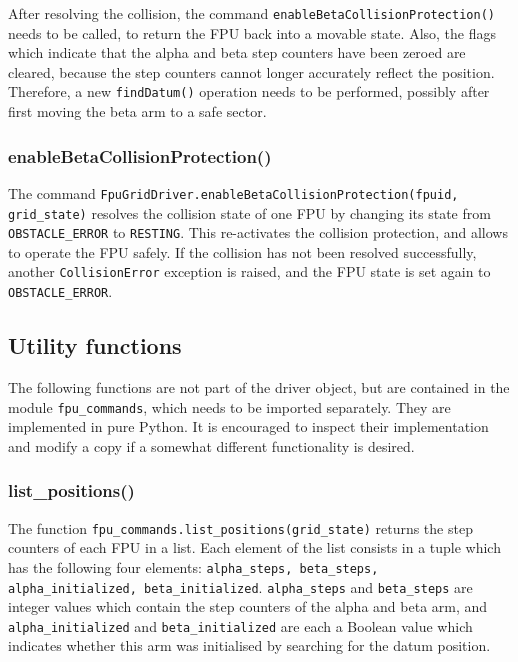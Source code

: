 \documentclass[11pt,a4paper]{report}
\begin{document}
After resolving the collision, the command
\texttt{enableBetaCollisionProtection()} needs to be called, to return
the FPU back into a movable state.  Also, the flags which indicate
that the alpha and beta step counters have been zeroed are cleared,
because the step counters cannot longer accurately reflect the
position. Therefore, a new \texttt{findDatum()} operation needs to be
performed, possibly after first moving the beta arm to a safe sector.



\subsubsection{enableBetaCollisionProtection()}

The command \texttt{FpuGridDriver.enableBetaCollisionProtection(fpuid,
  grid\_state)} resolves the collision state of one FPU by changing
its state from \texttt{OBSTACLE\_ERROR} to \texttt{RESTING}.  This
re-activates the collision protection, and allows to operate the FPU
safely. If the collision has not been resolved successfully, another
\texttt{CollisionError} exception is raised, and the FPU state is set
again to \texttt{OBSTACLE\_ERROR}.


\subsection{Utility functions}

The following functions are not part of the driver object, but are
contained in the module \texttt{fpu\_commands}, which needs to be
imported separately. They are implemented in pure Python. It is
encouraged to inspect their implementation and modify a copy if a
somewhat different functionality is desired.

\subsubsection{list\_positions()}
\label{sec:listpositions}
 
The function \texttt{fpu\_commands.list\_positions(grid\_state)}
returns the step counters of each FPU in a list.  Each element of the
list consists in a tuple which has the following four elements:
\texttt{alpha\_steps, beta\_steps, alpha\_initialized,
  beta\_initialized}. \texttt{alpha\_steps} and \texttt{beta\_steps}
are integer values which contain the step counters of the alpha and
beta arm, and \texttt{alpha\_initialized} and
\texttt{beta\_initialized} are each a Boolean value which indicates
whether this arm was initialised by searching for the datum position.
\end{document}
